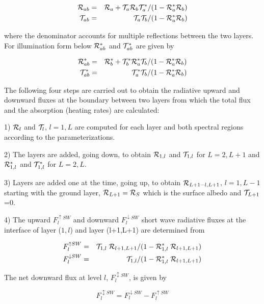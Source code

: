 \begin{eqnarray}\label{LH31}
{\cal R}_{ab} & = &{\cal R}_{a}+{\cal T}_{a}{\cal R}_b{\cal T}^{*}_a/(1-
{\cal R}^*_a{\cal R}_b) \nonumber \\
{\cal T}_{ab} & = &{\cal T}_a{\cal T}_b/(1-{\cal R}^*_a{\cal R}_b) 
\end{eqnarray}

where the denominator accounts for multiple
reflections between the two layers. For illumination
form below ${\cal R}^*_{ab}$ and ${\cal T}^*_{ab}$ are given by

\begin{eqnarray}\label{LH32}
{\cal R}^*_{ab} & = &{\cal R}^*_b+{\cal T}^*_b{\cal R}^*_a{\cal T}_b/(1-
{\cal R}^*_a{\cal R}_b) \nonumber \\
{\cal T}^*_{ab} & = &{\cal T}^*_a{\cal T}_b/(1-{\cal R}^*_a{\cal R}_b) 
\end{eqnarray}

The following four steps are carried out to obtain the
radiative upward and downward fluxes at the boundary
between two layers from which the total flux and the
absorption (heating rates) are calculated:

1) ${\cal R}_l$ and ${\cal T}_l$, $l=1, L$ are computed for each
layer and both spectral regions according to the
parameterizations.

2) The layers are added, going down, to obtain
${\cal R}_{1,l}$ and ${\cal T}_{1,l}$ for $L=2,L+1$ and
${\cal R}^*_{1,l}$ and ${\cal T}^*_{1,l}$ for $L=2,L$.

3) Layers are added one at the time, going up, to obtain
${\cal R}_{L+1-l,L+1}$, $l=1,L-1$ starting with the ground
layer, ${\cal R}_{L+1} = {\cal R}_S$ which is the surface albedo and
${\cal T}_{L+1}$=0.

4) The upward $F^{\uparrow SW}_l$ and downward
$F^{\downarrow SW}_l$ short wave radiative fluxes at
the interface of layer
($1,l$) and layer (l+1,L+1) are determined from

\begin{eqnarray}
F^{\uparrow SW}_l & = &{\cal T}_{1,l}\;{\cal R}_{l+1,L+1}/(1-
{\cal R}^*_{1,l}\;{\cal R}_{l+1,L+1}) \nonumber \\
F^{\downarrow SW}_l & = &{\cal T}_{1,l}/(1-
{\cal R}^*_{1,l}\;{\cal R}_{l+1,L+1}) 
\end{eqnarray}

The net downward flux at
level
$l$, $F_l^{\updownarrow SW}$, is given by

\begin{equation}
F_l^{\updownarrow SW}=F_l^{\downarrow SW}-F_l^{\uparrow SW}
\end{equation}

